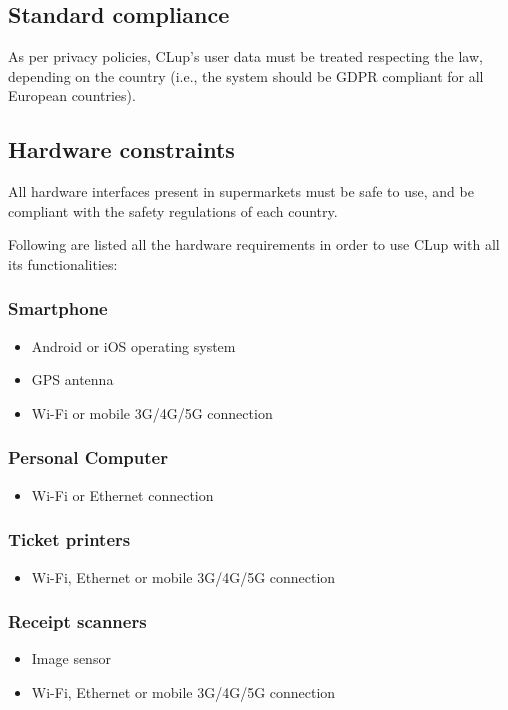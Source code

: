 \documentclass[../../main.tex]{subfiles}
\begin{document}
	\subsection{Standard compliance}

	As per privacy policies, CLup's user data must be treated respecting the law, depending on the 
	country (i.e., the system should be GDPR compliant for all European countries).

	\subsection{Hardware constraints}

	All hardware interfaces present in supermarkets must be safe to use, and be compliant with the safety regulations of each country.

	Following are listed all the hardware requirements in order to use CLup with all its functionalities:

	\subsubsection*{Smartphone}
	\begin{itemize}

		\item Android or iOS operating system

		\item GPS antenna

		\item Wi-Fi or mobile 3G/4G/5G connection

	\end{itemize}

	\subsubsection*{Personal Computer}
	\begin{itemize}

		\item Wi-Fi or Ethernet connection

	\end{itemize}

	\subsubsection*{Ticket printers}
	\begin{itemize}

		\item Wi-Fi, Ethernet or mobile 3G/4G/5G connection

	\end{itemize}

	\subsubsection*{Receipt scanners}
	\begin{itemize}

		\item Image sensor

		\item Wi-Fi, Ethernet or mobile 3G/4G/5G connection

	\end{itemize}
	
\end{document}
